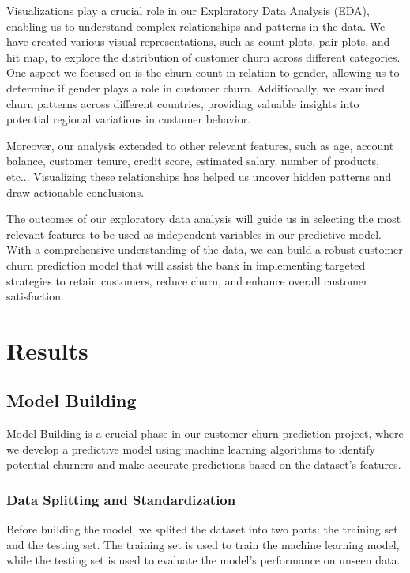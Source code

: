 \documentclass{article}
\begin{document}
\begin{multicols}{2}
Visualizations play a crucial role in our Exploratory Data Analysis (EDA), enabling us to understand complex relationships and patterns in the data. We have created various visual representations, such as count plots, pair plots, and hit map,  to explore the distribution of customer churn across different categories. One aspect we focused on is the churn count in relation to gender, allowing us to determine if gender plays a role in customer churn. Additionally, we examined churn patterns across different countries, providing valuable insights into potential regional variations in customer behavior.

Moreover, our analysis extended to other relevant features, such as age, account balance, customer tenure, credit score, estimated salary, number of products, etc... Visualizing these relationships has helped us uncover hidden patterns and draw actionable conclusions.

The outcomes of our exploratory data analysis will guide us in selecting the most relevant features to be used as independent variables in our predictive model. With a comprehensive understanding of the data, we can build a robust customer churn prediction model that will assist the bank in implementing targeted strategies to retain customers, reduce churn, and enhance overall customer satisfaction.

\section{Results}

\subsection{Model Building}

Model Building is a crucial phase in our customer churn prediction project, where we develop a predictive model using machine learning algorithms to identify potential churners and make accurate predictions based on the dataset's features.

\subsubsection{Data Splitting and Standardization}

Before building the model, we splited the dataset into two parts: the training set and the testing set. The training set is used to train the machine learning model, while the testing set is used to evaluate the model's performance on unseen data.


\end{multicols}
\end{document}
